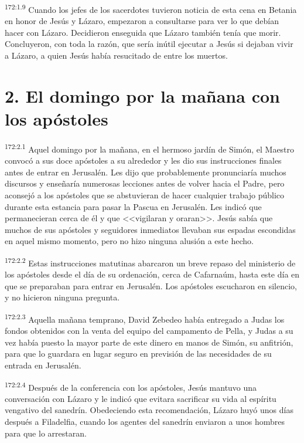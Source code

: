 \par 
\textsuperscript{172:1.9} Cuando los jefes de los sacerdotes tuvieron noticia de esta cena en Betania en honor de Jesús y Lázaro, empezaron a consultarse para ver lo que debían hacer con Lázaro. Decidieron enseguida que Lázaro también tenía que morir. Concluyeron, con toda la razón, que sería inútil ejecutar a Jesús si dejaban vivir a Lázaro, a quien Jesús había resucitado de entre los muertos.

\section*{2. El domingo por la mañana con los apóstoles}
\par 
\textsuperscript{172:2.1} Aquel domingo por la mañana, en el hermoso jardín de Simón, el Maestro convocó a sus doce apóstoles a su alrededor y les dio sus instrucciones finales antes de entrar en Jerusalén. Les dijo que probablemente pronunciaría muchos discursos y enseñaría numerosas lecciones antes de volver hacia el Padre, pero aconsejó a los apóstoles que se abstuvieran de hacer cualquier trabajo público durante esta estancia para pasar la Pascua en Jerusalén. Les indicó que permanecieran cerca de él y que <<vigilaran y oraran>>. Jesús sabía que muchos de sus apóstoles y seguidores inmediatos llevaban sus espadas escondidas en aquel mismo momento, pero no hizo ninguna alusión a este hecho.

\par 
\textsuperscript{172:2.2} Estas instrucciones matutinas abarcaron un breve repaso del ministerio de los apóstoles desde el día de su ordenación, cerca de Cafarnaúm, hasta este día en que se preparaban para entrar en Jerusalén. Los apóstoles escucharon en silencio, y no hicieron ninguna pregunta.

\par 
\textsuperscript{172:2.3} Aquella mañana temprano, David Zebedeo había entregado a Judas los fondos obtenidos con la venta del equipo del campamento de Pella, y Judas a su vez había puesto la mayor parte de este dinero en manos de Simón, su anfitrión, para que lo guardara en lugar seguro en previsión de las necesidades de su entrada en Jerusalén.

\par 
\textsuperscript{172:2.4} Después de la conferencia con los apóstoles, Jesús mantuvo una conversación con Lázaro y le indicó que evitara sacrificar su vida al espíritu vengativo del sanedrín. Obedeciendo esta recomendación, Lázaro huyó unos días después a Filadelfia, cuando los agentes del sanedrín enviaron a unos hombres para que lo arrestaran.

